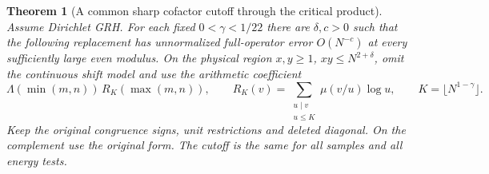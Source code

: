 \documentclass[11pt,a4paper]{article}
\numberwithin{equation}{section}
\newtheorem{theorem}{Theorem}[section]
\begin{document}
\begin{theorem}[A common sharp cofactor cutoff through the critical product]
\label{thm:sharp-common-cofactor}
Assume Dirichlet GRH. For each fixed $0<\gamma<1/22$ there
are $\delta,c>0$ such that the following replacement has
unnormalized full-operator error $O(N^{-c})$ at every
sufficiently large even modulus. On the physical region
$x,y\ge1$, $xy\le N^{2+\delta}$, omit the continuous shift
model and use the arithmetic coefficient
\begin{equation}
 \Lambda(\min(m,n))\,R_K(\max(m,n)),\qquad
 R_K(v)=\sum_{\substack{u\mid v\\ u\le K}}\mu(v/u)\log u,\qquad
 K=\lfloor N^{1-\gamma}\rfloor .
 \label{eq:common-sharp-cofactor}
\end{equation}
Keep the original congruence signs, unit restrictions and
deleted diagonal. On the complement use the original form.
The cutoff is the same for all samples and all energy tests.
\end{theorem}
\end{document}
